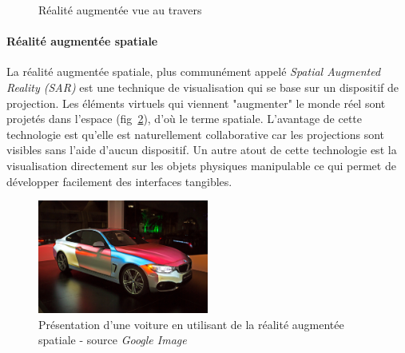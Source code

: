 \begin{figure}[h]
    \centering
\caption{Réalité augmentée vue au travers}
\label{fig:STAR}
\end{figure}


\paragraph{Réalité augmentée spatiale}
La réalité augmentée spatiale, plus communément appelé \emph{Spatial Augmented Reality (SAR)} est une technique de visualisation qui se base sur un dispositif de projection. Les éléments virtuels qui viennent "augmenter" le monde réel sont projetés dans l'espace (fig~\ref{fig:SAR}), d'où le terme spatiale. L'avantage de cette technologie est qu'elle est naturellement collaborative car les projections sont visibles sans l'aide d'aucun dispositif. Un autre atout de cette technologie est la visualisation directement sur les objets physiques manipulable ce qui permet de développer facilement des interfaces tangibles.

\begin{figure}[h]
\centering
\includegraphics[width=0.5\textwidth]{images/SARMappingCar2}
\caption{Présentation d'une voiture en utilisant de la réalité augmentée spatiale - source \textit{Google Image}}
\label{fig:SAR}
\end{figure}

